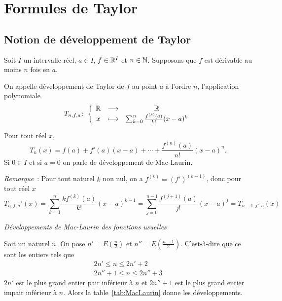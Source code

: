 \section{Formules de Taylor}

\subsection{Notion de développement de Taylor}

\begin{defdef}
  Soit \(I\) un intervalle réel, \(a \in I\), \(f \in \mathbb{R}^I\) et \(n \in \mathbb{N}\).
  Supposons que \(f\) est dérivable au moins \(n\) fois en \(a\).

  On appelle développement de Taylor de \(f\) au point \(a\) à l'ordre \(n\),
  l'application polynomiale
  \begin{equation}
    T_{n,f,a}\colon\left\{\begin{array}{ccc}\mathbb{R} & \longrightarrow &\mathbb{R}\\x & \longmapsto & \sum_{k = 0}^n \frac{f^{(k)}(a)}{k!}(x-a)^k\end{array}\right.
  \end{equation}

  Pour tout réel \(x\),
  \begin{equation}
    T_{n}(x)= f(a) + f'(a)(x-a) + \dotsb +\frac{f^{(n)}(a)}{n!}(x-a)^n.
  \end{equation}
Si \(0 \in I\) et si \(a = 0\) on parle de développement de Mac-Laurin.
\end{defdef}

\emph{Remarque}~: Pour tout naturel \(k\) non nul, on a \(f^{(k)} =
(f')^{(k-1)}\), donc pour tout réel \(x\)
\begin{equation}
  T_{n,f,a}'(x) = \sum_{k = 1}^n \frac{k f^{(k)}(a)}{k!}(x-a)^{k-1} =
  \sum_{j = 0}^{n-1} \frac{f^{(j+1)}(a)}{j!}(x-a)^j = T_{n-1,f',a}(x)
\end{equation}

\emph{Développements de Mac-Laurin des fonctions usuelles}

Soit un naturel \(n\). On pose \(n' = E\left(\frac{n}{2}\right)\) et
\(n'' = E\left(\frac{n-1}{2}\right)\). C'est-à-dire que ce sont les entiers tels
que
\begin{align*}
  2n' \leqslant n \leqslant 2n'+2 \\
  2n'' +1 \leqslant n \leqslant 2n''+3
\end{align*}
\(2n'\) est le plus grand entier pair inférieur à \(n\) et \(2n''+1\) est le
plus grand entier impair inférieur à \(n\). Alors la table~\ref{tab:MacLaurin} donne les développements.

